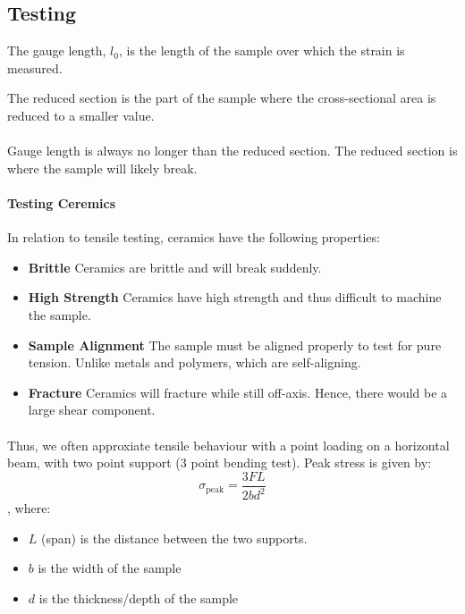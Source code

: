 \documentclass[11pt]{report}
\begin{document}
\subsection{Testing}
\begin{definition}
The gauge length, $l_0$, is the length of the sample over which the strain is measured.
\end{definition}
\begin{definition}
The reduced section is the part of the sample where the cross-sectional area is reduced to a smaller value.
\end{definition}
\paragraph{} Gauge length is always no longer than the reduced section. The reduced section is where the sample will likely break.
\paragraph{Testing Ceremics} In relation to tensile testing, ceramics have the following properties:
\begin{itemize}
    \item \textbf{Brittle} Ceramics are brittle and will break suddenly.
    \item \textbf{High Strength} Ceramics have high strength and thus difficult to machine the sample.
    \item \textbf{Sample Alignment} The sample must be aligned properly to test for pure tension. Unlike metals and polymers, which are self-aligning.
    \item \textbf{Fracture} Ceramics will fracture while still off-axis. Hence, there would be a large shear component. 
\end{itemize}
\paragraph{} Thus, we often approxiate tensile behaviour with a point loading on a horizontal beam, with two point support (3 point bending test). Peak stress is given by:
\begin{equation}
    \sigma_{\text{peak}} = \frac{3FL}{2bd^2}
\end{equation}
, where:
\begin{itemize}
    \item $L$ (span) is the distance between the two supports.
    \item $b$ is the width of the sample
    \item $d$ is the thickness/depth of the sample
\end{itemize}
\end{document}

